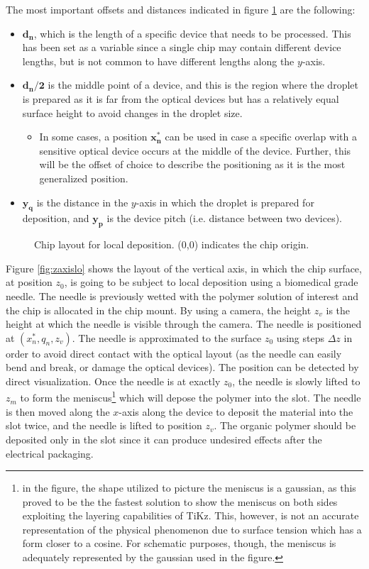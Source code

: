 The most important offsets and distances indicated in figure \ref{fig:chiplo} are the following:
\begin{itemize}
	\item $\mathbf{d_n}$, which is the length of a specific device that needs to be processed. This has been set as a variable since a single chip may contain different device lengths, but is not common to have different lengths along the $y$-axis.
	\item  $\mathbf{d_n/2}$ is the middle point of a device, and this is the region where the droplet is prepared as it is far from the optical devices but has a relatively equal surface height to avoid changes in the droplet size.
	\begin{itemize}
		\item In some cases, a position $\mathbf{x^*_n}$ can be used in case a specific overlap with a sensitive optical device occurs at the middle of the device. Further, this will be the offset of choice to describe the positioning as it is the most generalized position. 
	\end{itemize}
	\item $\mathbf{y_q}$ is the distance in the $y$-axis in which the droplet is prepared for deposition, and $\mathbf{y_p}$ is the device pitch (i.e. distance between two devices).   
\end{itemize}

\begin{figure}[!ht]
\centering
  
  \caption{Chip layout for local deposition. (0,0) indicates the chip origin.}
  \label{fig:chiplo}
\end{figure}

Figure \ref{fig:zaxislo} shows the layout of the vertical axis, in which the chip surface, at position $z_0$, is going to be subject to local deposition using a biomedical grade needle. The needle is previously wetted with the polymer solution of interest and the chip is allocated in the chip mount. By using a camera, the height $z_v$ is the height at which the needle is visible through the camera. The needle is positioned at $(x^*_n, q_n,z_v)$. The needle is approximated to the surface $z_0$ using steps $\Delta z$ in order to avoid direct contact with the optical layout (as the needle can easily bend and break, or damage the optical devices). The position can be detected by direct visualization. Once the needle is at exactly $z_0$, the needle is slowly lifted to $z_m$ to form the meniscus\footnote{in the figure, the shape utilized to picture the meniscus is a gaussian, as this proved to be the the fastest solution to show the meniscus on both sides exploiting the layering capabilities of TiKz. This, however, is not an accurate representation of the physical phenomenon due to surface tension which has a form closer to a cosine. For schematic purposes, though, the meniscus is adequately represented by the gaussian used in the figure.} which will depose the polymer into the slot. The needle is then moved along the $x$-axis along the device to deposit the material into the slot twice, and the needle is lifted to position $z_v$. The organic polymer should be deposited only in the slot since it can produce undesired effects after the electrical packaging.

